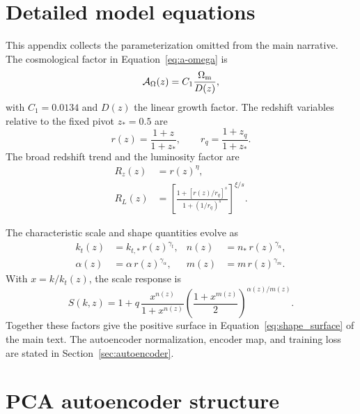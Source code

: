 \appendix
{}

\section{Detailed model equations}
\label{app:detailed-equations}

This appendix collects the parameterization omitted from the main narrative.
The cosmological factor in Equation~\ref{eq:a-omega} is
\begin{equation}
  \mathcal A_\Omega(z)=C_1\frac{\Omega_{\rm m}}{D(z)},
\end{equation}
with $C_1=0.0134$ and $D(z)$ the linear growth factor.  The redshift
variables relative to the fixed pivot $z_*=0.5$ are
\begin{equation}
  r(z)=\frac{1+z}{1+z_*},
  \qquad
  r_q=\frac{1+z_q}{1+z_*}.
\end{equation}
The broad redshift trend and the luminosity factor are
\begin{equation}
  \begin{aligned}
    R_z(z) &= r(z)^\eta,\\
    R_L(z) &=
    \left[
      \frac{1+[r(z)/r_q]^s}{1+(1/r_q)^s}
    \right]^{\xi/s}.
  \end{aligned}
\end{equation}

The characteristic scale and shape quantities evolve as
\begin{equation}
  \begin{aligned}
    k_t(z) &= k_{t,*}\,r(z)^{\gamma_t}, &
    n(z) &= n_*\,r(z)^{\gamma_n},\\
    \alpha(z) &= \alpha\,r(z)^{\gamma_\alpha}, &
    m(z) &= m\,r(z)^{\gamma_m}.
  \end{aligned}
\end{equation}
With $x=k/k_t(z)$, the scale response is
\begin{equation}
  S(k,z)=1+q\,
  \frac{x^{n(z)}}{1+x^{n(z)}}
  \left(\frac{1+x^{m(z)}}{2}\right)^{\alpha(z)/m(z)}.
\end{equation}
Together these factors give the positive surface in
Equation~\ref{eq:shape_surface} of the main text.  The autoencoder
normalization, encoder map, and training loss are stated in
Section~\ref{sec:autoencoder}.

\section{PCA autoencoder structure}
\label{app:pca-ae}

